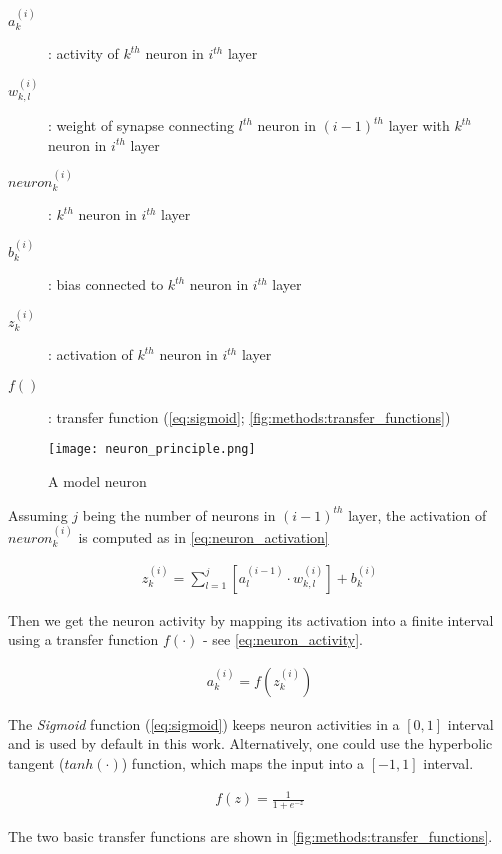 \begin{description}
\item[$ a_k^{(i)} $] : activity of $ k^{th} $ neuron in $ i^{th} $ layer
\item[$ w_{k,l}^{(i)} $] : weight of synapse connecting $ l^{th} $ neuron in $ (i-1)^{th} $ layer with $ k^{th} $ neuron in $ i^{th} $ layer
\item[$ neuron_k^{(i)} $] : $ k^{th} $ neuron in $ i^{th} $ layer
\item[$ b_k^{(i)} $] : bias connected to $ k^{th} $ neuron in $ i^{th} $ layer
\item[$ z_k^{(i)} $] : activation of $ k^{th} $ neuron in $ i^{th} $ layer
\item[$ f() $] : transfer function (\cref{eq:sigmoid}; \cref{fig:methods:transfer_functions})
\end{description}

\begin{figure}[H]
  \centering
  \texttt{[image: neuron\_principle.png]}
  \caption{A model neuron}
  \label{fig:methods:model_neuron}
\end{figure}

Assuming $ j $ being the number of neurons in $ (i-1)^{th} $ layer, the activation of $ neuron_k^{(i)} $ is computed as in \cref{eq:neuron_activation}

\begin{align} \label{eq:neuron_activation}
z_k^{(i)} = \displaystyle{\sum_{l=1}^{j} [a_l^{(i-1)} \cdot w_{k,l}^{(i)}]} + b_k^{(i)}
\end{align}

Then we get the neuron activity by mapping its activation into a finite interval using a transfer function $ f(\cdot) $ - see \cref{eq:neuron_activity}. 

\begin{align} \label{eq:neuron_activity}
a_k^{(i)} = f(z_k^{(i)})
\end{align}

The \textit{Sigmoid} function (\cref{eq:sigmoid}) keeps neuron activities in a $ [0, 1] $ interval and is used by default in this work. Alternatively, one could use the hyperbolic tangent ($ tanh(\cdot) $) function, which maps the input into a $ [-1, 1] $ interval.

\begin{align} \label{eq:sigmoid}
f(z) = \frac{1}{1 + e^{-z}}
\end{align}

The two basic transfer functions are shown in \cref{fig:methods:transfer_functions}.

